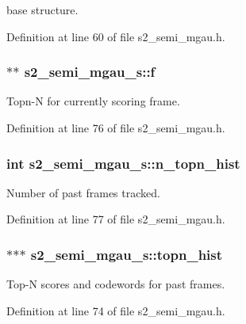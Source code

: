 base structure. 



Definition at line 60 of file s2\+\_\+semi\+\_\+mgau.\+h.

\subsubsection[{f}]{$\ast$$\ast$ s2\+\_\+semi\+\_\+mgau\+\_\+s\+::f}\label{structs2__semi__mgau__s_ad8cb7f058bcc7402dd6a41c61f1b26e5}


Topn-\/\+N for currently scoring frame. 



Definition at line 76 of file s2\+\_\+semi\+\_\+mgau.\+h.

\subsubsection[{n\+\_\+topn\+\_\+hist}]{\setlength{\rightskip}{0pt plus 5cm}int s2\+\_\+semi\+\_\+mgau\+\_\+s\+::n\+\_\+topn\+\_\+hist}\label{structs2__semi__mgau__s_a3cbc9fe683da5b7befe6b2712adae327}


Number of past frames tracked. 



Definition at line 77 of file s2\+\_\+semi\+\_\+mgau.\+h.

\subsubsection[{topn\+\_\+hist}]{$\ast$$\ast$$\ast$ s2\+\_\+semi\+\_\+mgau\+\_\+s\+::topn\+\_\+hist}\label{structs2__semi__mgau__s_a8892e22acbf81b08972cb6d7968ed4ce}


Top-\/\+N scores and codewords for past frames. 



Definition at line 74 of file s2\+\_\+semi\+\_\+mgau.\+h.


